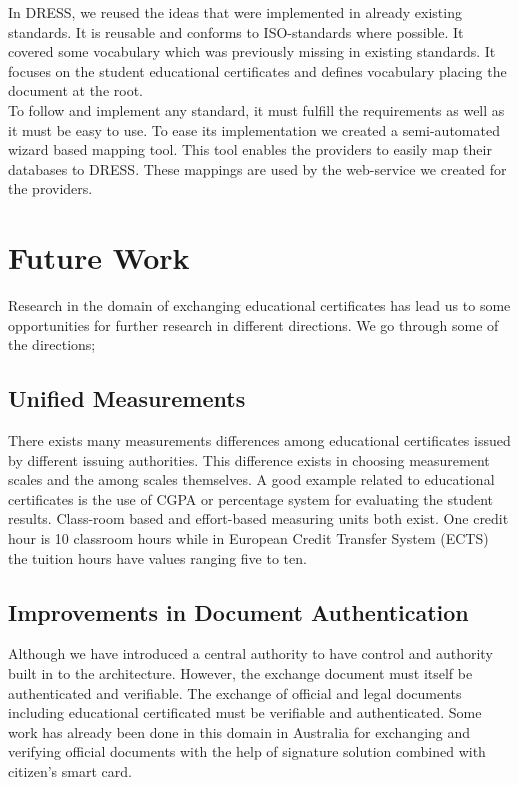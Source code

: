 \documentclass[12pt,a4paper,oneside]{book}
\begin{document}
	In DRESS, we reused the ideas that were implemented in already existing standards. It is reusable and conforms to ISO-standards where possible. It covered some vocabulary which was previously missing in existing standards. It focuses on the student educational certificates and defines vocabulary placing the document at the root. \\
	
	To follow and implement any standard, it must fulfill the requirements as well as it must be easy to use. To ease its implementation we created a semi-automated wizard based mapping tool. This tool enables the providers to easily map their databases to DRESS. These mappings are used by the web-service we created for the providers.
	
	 
		
	
	\section{Future Work}\label{sec:future}
	Research in the domain of exchanging educational certificates has lead us to some opportunities for further research in different directions. We go through some of the directions; 
	
	\subsection{Unified Measurements} 
	There exists many measurements differences among educational certificates issued by different issuing authorities. This difference exists in choosing measurement scales and the among scales themselves. A good example related to educational certificates is the use of CGPA or percentage system for evaluating the student results. Class-room based and effort-based measuring units both exist. One credit hour is 10 classroom hours while in European Credit Transfer System (ECTS) the tuition hours have values ranging five  to ten. \cite{EHEA}
	
	\subsection{Improvements in Document Authentication} 
	Although we have introduced a central authority to have control and authority built in to the architecture. However, the exchange document must itself be authenticated and verifiable. The exchange of official and legal documents including educational certificated must be verifiable and authenticated. Some work has already been done in this domain in Australia for exchanging and verifying  official documents with the help of signature solution combined with citizen's smart card\cite{Authentic PDF}. \\
	
\end{document}
